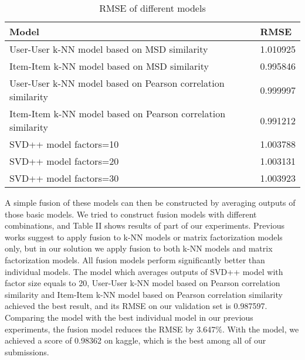 \documentclass[10pt,conference,compsocconf]{IEEEtran}
\begin{document}
\begin{table}
\renewcommand{\arraystretch}{1.3}
\begin{tabular}{|l|l|}
\hline
\textbf{Model}                                                   & \textbf{RMSE} \\ \hline
User-User k-NN model based on MSD similarity                     & 1.010925     \\ \hline
Item-Item k-NN model based on MSD similarity                     & 0.995846     \\ \hline
User-User k-NN model based on Pearson correlation similarity     & 0.999997     \\ \hline
Item-Item k-NN model based on Pearson correlation similarity     & 0.991212     \\ \hline
SVD++ model factors=10                                           & 1.003788     \\ \hline
SVD++ model factors=20                                           & 1.003131     \\ \hline
SVD++ model factors=30                                           & 1.003923     \\ \hline
\end{tabular}
\caption{RMSE of different models}
\label{tab:models}
\end{table}

A simple fusion of these models can then be constructed by averaging outputs of those basic models. We tried to construct fusion models with different combinations, and Table II shows results of part of our experiments. Previous works suggest to apply fusion to k-NN models or matrix factorization models only\cite{ariel}, but in our solution we apply fusion to both k-NN models and matrix factorization models. All fusion models perform significantly better than individual models. The model which averages outputs of SVD++ model with factor size equals to 20, User-User k-NN model based on Pearson correlation similarity and Item-Item k-NN model based on Pearson correlation similarity achieved the best result, and its RMSE on our validation set is 0.987597. Comparing the model with the best individual model in our previous experiments, the fusion model reduces the RMSE by 3.647\%. With the model, we achieved a score of 0.98362 on kaggle, which is the best among all of our submissions.
\end{document}

